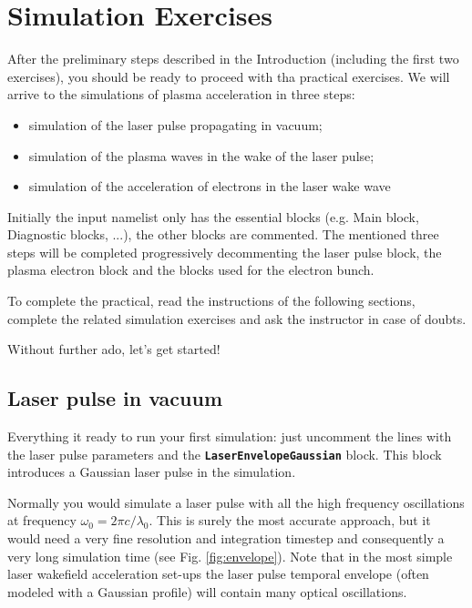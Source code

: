 \documentclass[a4paper,12pt]{extarticle}
\newcommand{\commandline}[1]{\texttt{\textbf{#1}}}
\begin{document}
\section{Simulation Exercises}
After the preliminary steps described in the Introduction (including the first two exercises), you should be ready to proceed with tha practical exercises.  We will arrive to the simulations of plasma acceleration in three steps:
\begin{itemize}
\item simulation of the laser pulse propagating in vacuum;
\item simulation of the plasma waves in the wake of the laser pulse;
\item simulation of the acceleration of electrons in the laser wake wave
\end{itemize}

Initially the input namelist only has the essential blocks (e.g. Main block, Diagnostic blocks, ...),  the other blocks are commented. The mentioned three steps will be completed progressively decommenting the laser pulse block, the plasma electron block and the blocks used for the electron bunch.

To complete the practical, read the instructions of the following sections, complete the related simulation exercises and ask the instructor in case of doubts. 

Without further ado, let's get started!

\subsection{Laser pulse in vacuum}
Everything it ready to run your first simulation: just uncomment the lines with the laser pulse parameters and the \commandline{LaserEnvelopeGaussian} block. This block introduces a Gaussian laser pulse in the simulation.

Normally you would simulate a laser pulse with all the high frequency oscillations at frequency $\omega_0=2\pi c/\lambda_0$. This is surely the most accurate approach, but it would need a very fine resolution and integration timestep and consequently a very long simulation time (see Fig. \ref{fig:envelope}). Note that in the most simple laser wakefield acceleration set-ups the laser pulse temporal envelope (often modeled with a Gaussian profile) will contain many optical oscillations.
\end{document}
